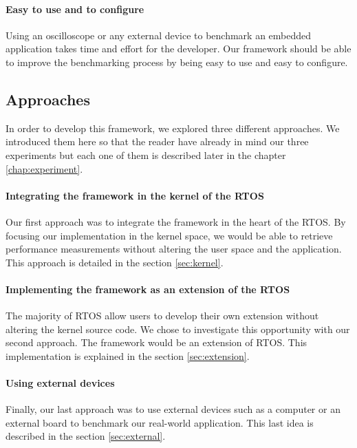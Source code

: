 \paragraph{Easy to use and to configure}
Using an oscilloscope or any external device to benchmark an embedded application takes time and effort for the developer.
Our framework should be able to improve the benchmarking process by being easy to use and easy to configure.

\subsection{Approaches}

In order to develop this framework, we explored three different approaches.
We introduced them here so that the reader have already in mind our three experiments but each one of them is described later in the chapter \ref{chap:experiment}.

\paragraph{Integrating the framework in the kernel of the RTOS}
Our first approach was to integrate the framework in the heart of the RTOS.
By focusing our implementation in the kernel space, we would be able to retrieve performance measurements without altering the user space and the application.
This approach is detailed in the section \ref{sec:kernel}.

\paragraph{Implementing the framework as an extension of the RTOS}
The majority of RTOS allow users to develop their own extension without altering the kernel source code.
We chose to investigate this opportunity with our second approach.
The framework would be an extension of RTOS.
This implementation is explained in the section \ref{sec:extension}.

\paragraph{Using external devices}
Finally, our last approach was to use external devices such as a computer or an external board to benchmark our real-world application.
This last idea is described in the section \ref{sec:external}.
